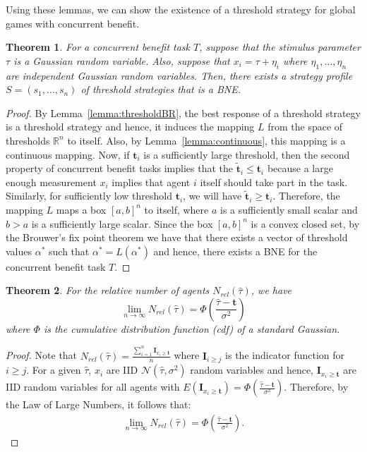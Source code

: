 \documentclass[12pt]{article}
\newtheorem{theorem}{Theorem}
\def\R{\mathbb{R}}    %
\def\td{\mathbf{t}}   %
\begin{document}
Using these lemmas, we can show the existence of a threshold strategy for global games with concurrent benefit. 
\begin{theorem}\label{thrm:mainthrm}
For a concurrent benefit task $T$, suppose that the stimulus parameter $\tau$ is a Gaussian random variable. Also, suppose that $x_i=\tau+\eta_i$ where $\eta_1,\ldots,\eta_n$ are independent Gaussian random variables. Then, there exists a strategy profile $S=(s_1,\ldots,s_n)$ of threshold strategies that is a BNE.
\end{theorem}
\begin{proof}
By Lemma~\ref{lemma:thresholdBR}, the best response of a threshold strategy is a threshold strategy and hence, it induces the mapping $L$ from the space of thresholds $\R^n$ to itself. Also, by Lemma~\ref{lemma:continuous}, this mapping is a continuous mapping. Now, if $\td_i$ is a sufficiently large threshold, then the second property of concurrent benefit tasks implies that the $\tilde{\td}_i\leq \td_i$ because a large enough measurement $x_i$ implies that agent $i$ itself should take part in the task. Similarly, for sufficiently low threshold $\td_i$, we will have $\tilde{\td}_i\geq \td_i$. Therefore, the mapping $L$ maps a box $[a,b]^n$ to itself, where $a$ is a sufficiently small scalar and $b>a$ is a sufficiently large scalar. Since the box $[a,b]^n$ is a convex closed set, by the Brouwer's fix point theorem\cite{Border1990} we have that there exists a vector of threshold values $\alpha^*$ such that $\alpha^*=L(\alpha^*)$ and hence, there exists a BNE for the concurrent benefit task $T$.
\end{proof}

\begin{theorem}\label{thrm:relativefrequency}
For the relative number of agents $N_{rel}(\hat{\tau})$, we have
\begin{equation}
\lim_{n\to\infty}N_{rel}(\hat{\tau})=\Phi(\frac{\hat{\tau}-\td}{\sigma^2})
\end{equation}
where $\Phi$ is the cumulative distribution function (cdf) of a standard Gaussian. 
\end{theorem}
\begin{proof}
Note that $N_{rel}(\hat{\tau})=\frac{\sum_{i=1}^n\mathbf{I}_{x_i\geq \td}}{n}$ where $\mathbf{I}_{i\geq j}$ is the indicator function for $i\geq j$. For a given $\hat{\tau}$, $x_i$ are IID $\mathcal{N}(\hat{\tau},\sigma^2)$ random variables and hence, $\mathbf{I}_{x_i\geq \td}$ are IID random variables for all agents with $E(\mathbf{I}_{x_i\geq \td})=\Phi(\frac{\hat{\tau}-\td}{\sigma^2})$. Therefore, by the Law of Large Numbers, it follows that:
\begin{align*}
\lim_{n\to\infty}N_{rel}(\hat{\tau})=\Phi(\frac{\hat{\tau}-\td}{\sigma^2}).
\end{align*}
\end{proof}
\end{document}
